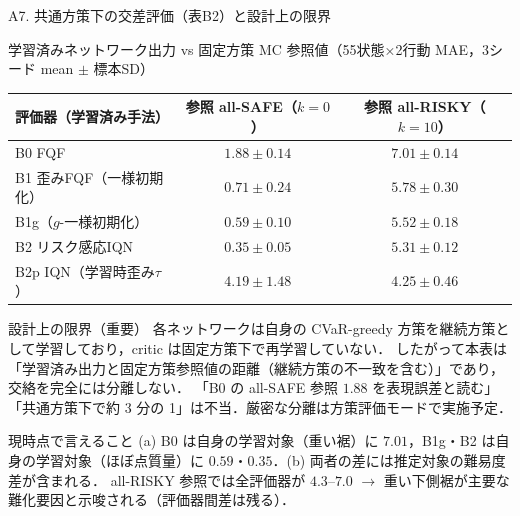 \documentclass[aspectratio=169, 10pt]{beamer}
\newcommand{\blue}[1]{\textcolor{blue!80!black}{#1}}
\begin{document}
\begin{frame}{A7. 共通方策下の交差評価（表B2）と設計上の限界}
  \scriptsize
  \begin{block}{学習済みネットワーク出力 vs 固定方策 MC 参照値（55状態×2行動 MAE，3シード mean $\pm$ 標本SD）}
    \centering
    \setlength{\tabcolsep}{5pt}
    \begin{tabular}{@{}lcc@{}}
      \toprule
      評価器（学習済み手法） & 参照 all-SAFE（$k=0$） & 参照 all-RISKY（$k=10$） \\
      \midrule
      B0 FQF & $1.88\pm0.14$ & $7.01\pm0.14$ \\
      B1 歪みFQF（一様初期化） & $0.71\pm0.24$ & $5.78\pm0.30$ \\
      B1g（$g$-一様初期化） & $0.59\pm0.10$ & $5.52\pm0.18$ \\
      B2 リスク感応IQN & $\mathbf{0.35\pm0.05}$ & $5.31\pm0.12$ \\
      B2p IQN（学習時歪み$\tau$） & $4.19\pm1.48$ & $4.25\pm0.46$ \\
      \bottomrule
    \end{tabular}
  \end{block}
  \begin{alertblock}{設計上の限界（重要）}
    各ネットワークは\alert{自身の CVaR-greedy 方策}を継続方策として学習しており，critic は固定方策下で再学習していない．
    したがって本表は「学習済み出力と固定方策参照値の距離（\alert{継続方策の不一致を含む}）」であり，\alert{交絡を完全には分離しない}．
    「B0 の all-SAFE 参照 $1.88$ を表現誤差と読む」「共通方策下で約 3 分の 1」は\alert{不当}．厳密な分離は\blue{方策評価モード}で実施予定．
  \end{alertblock}
  \begin{exampleblock}{現時点で言えること}
    (a) B0 は自身の学習対象（重い裾）に $7.01$，B1g・B2 は自身の学習対象（ほぼ点質量）に $0.59$・$0.35$．(b) 両者の差には推定対象の難易度差が含まれる．
    all-RISKY 参照では全評価器が $4.3$--$7.0$ $\to$ 重い下側裾が主要な難化要因と示唆される（評価器間差は残る）．
  \end{exampleblock}
\end{frame}
\end{document}

